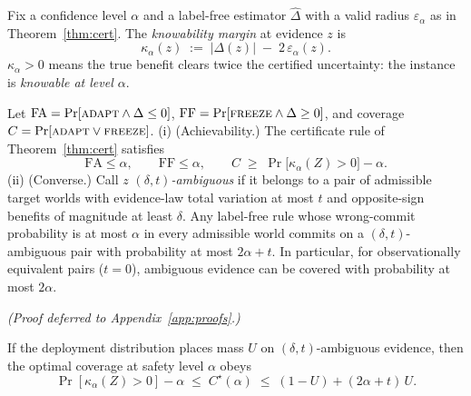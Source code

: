 
\begin{definition}\label{def:margin}
Fix a confidence level $\alpha$ and a label-free estimator $\widehat\Delta$ with a valid
radius $\varepsilon_\alpha$ as in Theorem~\ref{thm:cert}. The \emph{knowability margin} at
evidence $z$ is
\[
\kappa_\alpha(z)\;:=\;|\Delta(z)|\;-\;2\,\varepsilon_\alpha(z).
\]
$\kappa_\alpha>0$ means the true benefit clears twice the certified uncertainty: the
instance is \emph{knowable at level $\alpha$}.
\end{definition}

\begin{theorem}\label{thm:frontier}
Let $\mathrm{FA}=\Pr[\textsc{adapt}\wedge\Delta\le0]$, $\mathrm{FF}=\Pr[\textsc{freeze}\wedge\Delta\ge0]$,
and coverage $C=\Pr[\textsc{adapt}\vee\textsc{freeze}]$.
\textup{(i) (Achievability.)} The certificate rule of Theorem~\ref{thm:cert} satisfies
\[
\mathrm{FA}\le\alpha,\qquad \mathrm{FF}\le\alpha,\qquad
C\;\ge\;\Pr\!\big[\kappa_\alpha(Z)>0\big]-\alpha .
\]
\textup{(ii) (Converse.)} Call $z$ \emph{$(\delta,t)$-ambiguous} if it belongs to a pair of
admissible target worlds with evidence-law total variation at most $t$ and opposite-sign
benefits of magnitude at least $\delta$. Any label-free rule whose wrong-commit
probability is at most $\alpha$ in every admissible world commits on a
$(\delta,t)$-ambiguous pair with probability at most $2\alpha+t$. In particular, for
observationally equivalent pairs ($t=0$), ambiguous evidence can be covered with
probability at most $2\alpha$.
\end{theorem}

\emph{(Proof deferred to Appendix~\ref{app:proofs}.)}

\begin{proposition}\label{prop:sandwich}
If the deployment distribution places mass $U$ on $(\delta,t)$-ambiguous evidence, then the
optimal coverage at safety level $\alpha$ obeys
\[
\Pr[\kappa_\alpha(Z)>0]-\alpha\;\le\;C^\star(\alpha)\;\le\;(1-U)+(2\alpha+t)\,U .
\]
\end{proposition}


